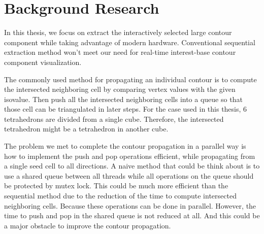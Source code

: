 \documentclass[11pt, b5paper]{report}
\begin{document}
\section{Background Research}



In this thesis, we focus on extract the interactively selected large 
contour component while taking advantage of modern hardware. Conventional
sequential extraction method won't meet our need for real-time interest-base
contour component visualization.

The commonly used method for propagating an individual contour is to compute
the intersected neighboring cell by comparing vertex values with the given 
isovalue. Then push all the intersected neighboring cells into a queue so 
that those cell can be triangulated in later steps. For the case used in 
this thesis, 6 tetrahedrons are divided from a single cube. Therefore, 
the intersected tetrahedron might be a tetrahedron in another cube.

The problem we met to complete the contour propagation in a parallel
way is how to implement the push and pop operations efficient, while 
propagating from a single seed cell to all directions. A naive method that
could be think about is to use a shared queue between all threads while all
operations on the queue should be protected by mutex lock. This could be 
much more efficient than the sequential method due to the reduction of the 
time to compute intersected neighboring cells. Because these operations 
can be done in parallel. However, the time to push and pop in the shared 
queue is not reduced at all. And this could be a major obstacle to improve
the contour propagation.


\end{document}
